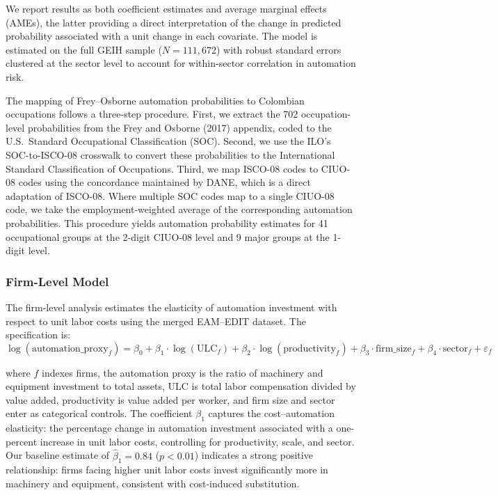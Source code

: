 \documentclass{article}
\begin{document}
We report results as both coefficient estimates and average marginal effects (AMEs), the latter providing a direct interpretation of the change in predicted probability associated with a unit change in each covariate. The model is estimated on the full GEIH sample ($N = 111{,}672$) with robust standard errors clustered at the sector level to account for within-sector correlation in automation risk.

The mapping of Frey--Osborne automation probabilities to Colombian occupations follows a three-step procedure. First, we extract the 702 occupation-level probabilities from the Frey and Osborne (2017) appendix, coded to the U.S.\ Standard Occupational Classification (SOC). Second, we use the ILO's SOC-to-ISCO-08 crosswalk to convert these probabilities to the International Standard Classification of Occupations. Third, we map ISCO-08 codes to CIUO-08 codes using the concordance maintained by DANE, which is a direct adaptation of ISCO-08. Where multiple SOC codes map to a single CIUO-08 code, we take the employment-weighted average of the corresponding automation probabilities. This procedure yields automation probability estimates for 41 occupational groups at the 2-digit CIUO-08 level and 9 major groups at the 1-digit level.

\subsubsection*{Firm-Level Model}

The firm-level analysis estimates the elasticity of automation investment with respect to unit labor costs using the merged EAM--EDIT dataset. The specification is:
\begin{equation}
\log(\text{automation\_proxy}_{f}) = \beta_0 + \beta_1 \cdot \log(\text{ULC}_{f}) + \beta_2 \cdot \log(\text{productivity}_{f}) + \beta_3 \cdot \text{firm\_size}_{f} + \beta_4 \cdot \text{sector}_{f} + \varepsilon_{f}
\label{eq:firm}
\end{equation}

\noindent where $f$ indexes firms, the automation proxy is the ratio of machinery and equipment investment to total assets, ULC is total labor compensation divided by value added, productivity is value added per worker, and firm size and sector enter as categorical controls. The coefficient $\beta_1$ captures the cost--automation elasticity: the percentage change in automation investment associated with a one-percent increase in unit labor costs, controlling for productivity, scale, and sector. Our baseline estimate of $\hat{\beta}_1 = 0.84$ ($p < 0.01$) indicates a strong positive relationship: firms facing higher unit labor costs invest significantly more in machinery and equipment, consistent with cost-induced substitution.
\end{document}
